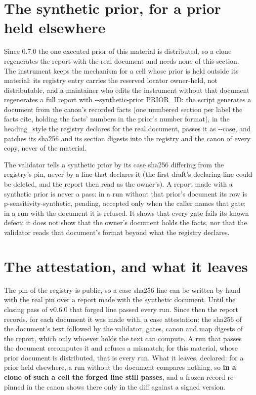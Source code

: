 \documentclass[
  american,
  10pt,
]{report}
\newcounter{none} %
\renewcommand{\texttt}[1]{{\ttfamily\hyphenchar\font=-1 #1}}
\begin{document}
\section{The synthetic prior, for a prior held
elsewhere}\label{the-synthetic-prior-for-a-prior-held-elsewhere}

Since 0.7.0 the one executed prior of this material is distributed, so a
clone regenerates the report with the real document and needs none of
this section. The instrument keeps the mechanism for a cell whose prior
is held outside its material: its registry entry carries the reserved
locator \texttt{owner-\allowbreak{}held, not distributable}, and a
maintainer who edits the instrument without that document regenerates a
full report with
\texttt{-\allowbreak{}-\allowbreak{}synthetic-\allowbreak{}prior PRIOR\_\allowbreak{}ID}:
the script generates a document from the canon's recorded facts (one
numbered section per label the facts cite, holding the facts' numbers in
the prior's number format), in the \texttt{heading\_\allowbreak{}style}
the registry declares for the real document, passes it as
\texttt{-\allowbreak{}-\allowbreak{}case}, and patches its sha256 and
its section digests into the registry and the canon of every copy, never
of the material.

The validator tells a synthetic prior by its \texttt{case sha256}
differing from the registry's pin, never by a line that declares it (the
first draft's declaring line could be deleted, and the report then read
as the owner's). A report made with a synthetic prior is never a pass:
in a run without that prior's document its row is
\texttt{p-\allowbreak{}sensitivity-\allowbreak{}synthetic}, pending,
accepted only when the caller names that gate; in a run with the
document it is refused. It shows that every gate fails its known defect;
it does not show that the owner's document holds the facts, nor that the
validator reads that document's format beyond what the registry
declares.

\section{The attestation, and what it
leaves}\label{the-attestation-and-what-it-leaves}

The pin of the registry is public, so a \texttt{case sha256} line can be
written by hand with the real pin over a report made with the synthetic
document. Until the closing pass of v0.6.0 that forged line passed every
run. Since then the report records, for each document it was made with,
a \texttt{case attestation}: the sha256 of the document's text followed
by the validator, gates, canon and map digests of the report, which only
whoever holds the text can compute. A run that passes the document
recomputes it and refuses a mismatch; for this material, whose prior
document is distributed, that is every run. What it leaves, declared:
for a prior held elsewhere, a run without the document compares nothing,
so \textbf{in a clone of such a cell the forged line still passes}, and
a frozen record re-pinned in the canon shows there only in the diff
against a signed version.
\end{document}
